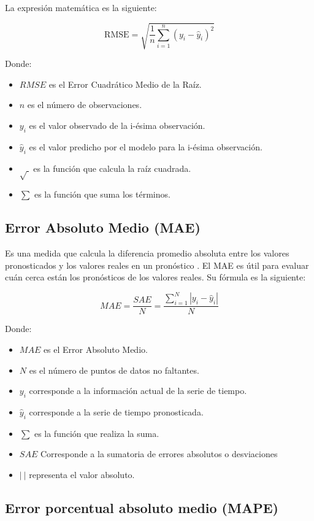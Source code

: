 La expresión matemática es la siguiente:

\[
\text{RMSE} = \sqrt{\frac{1}{n} \sum_{i=1}^{n} (y_i - \hat{y}_i)^2}
\]

Donde:

\begin{itemize}
  \item $RMSE$ es el Error Cuadrático Medio de la Raíz.
  \item $n$ es el número de observaciones.
  \item $y_i$ es el valor observado de la i-ésima observación.
  \item $\hat{y}_i$ es el valor predicho por el modelo para la i-ésima observación.
  \item \(\sqrt{\ }\) es la función que calcula la raíz cuadrada.
  \item $\sum$ es la función que suma los términos.
\end{itemize}


\subsection{Error Absoluto Medio (MAE)} 
Es una medida que calcula la diferencia promedio absoluta entre los valores pronosticados y los valores reales en un pronóstico \cite{chang2023comparacion}. El MAE es útil para evaluar cuán cerca están los pronósticos de los valores reales. Su fórmula es la siguiente:

\[
MAE = \frac{SAE}{N} = \frac{\sum_{i=1}^{N} |y_i - \hat{y}_i|}{N}
\]

Donde:

\begin{itemize}
    \item $MAE$ es el Error Absoluto Medio.
    \item $N$ es el número de puntos de datos no faltantes.
    \item $y_i$ corresponde a la información actual de la serie de tiempo.
    \item $\hat{y}_i$ corresponde a la serie de tiempo pronosticada.
    \item $\sum$ es la función que realiza la suma.
    \item $SAE$  Corresponde a la sumatoria de errores absolutos o desviaciones
    \item $|\ |$ representa el valor absoluto.
\end{itemize}

\subsection{Error porcentual absoluto medio (MAPE)} 

